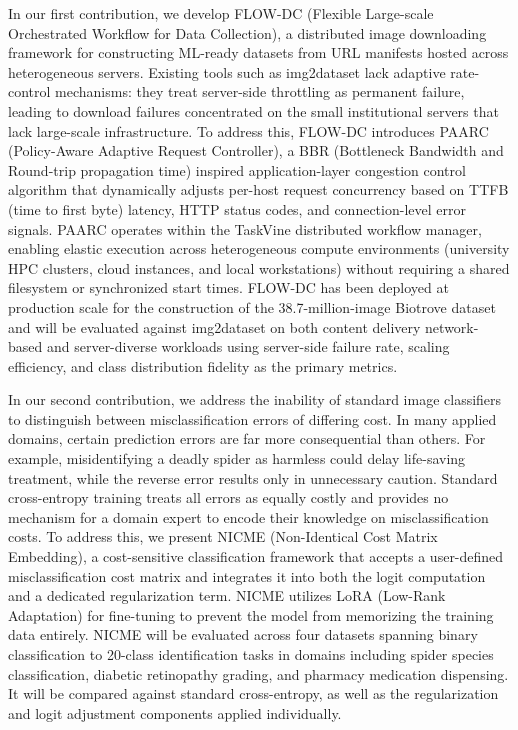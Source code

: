 \documentclass[11pt, letterpaper]{article}
\begin{document}
In our first contribution, we develop FLOW-DC (Flexible Large-scale
Orchestrated Workflow for Data Collection), a distributed image downloading
framework for constructing ML-ready datasets from URL manifests hosted across
heterogeneous servers. Existing tools such as img2dataset lack
adaptive rate-control mechanisms: they treat server-side throttling as
permanent failure, leading to download failures concentrated on the
small institutional servers that lack large-scale infrastructure. To address this, FLOW-DC introduces PAARC
(Policy-Aware Adaptive Request Controller), a BBR (Bottleneck Bandwidth and Round-trip propagation time) inspired application-layer
congestion control algorithm that dynamically adjusts per-host request
concurrency based on TTFB (time to first byte) latency, HTTP status codes, and connection-level
error signals. PAARC operates within the TaskVine distributed workflow
manager, enabling elastic execution across heterogeneous compute
environments (university HPC clusters, cloud instances, and local
workstations) without requiring a shared filesystem or synchronized start
times. FLOW-DC has been deployed at production scale for the construction of
the 38.7-million-image Biotrove dataset and will be evaluated against
img2dataset on both content delivery network-based and server-diverse workloads using
server-side failure rate, scaling efficiency, and class distribution fidelity
as the primary metrics.

In our second contribution, we address the inability of standard image classifiers to distinguish between misclassification errors of differing cost. In many applied domains, certain prediction errors are far more consequential than others. For example, misidentifying a deadly spider as harmless could delay life-saving treatment, while the reverse error results only in unnecessary caution. Standard cross-entropy training treats all errors as equally costly and provides no mechanism for a domain expert to encode their knowledge on misclassification costs. To address this, we present NICME (Non-Identical Cost Matrix Embedding), a cost-sensitive classification framework that accepts a user-defined misclassification cost matrix and integrates it into both the logit computation and a dedicated regularization term. NICME utilizes LoRA (Low-Rank Adaptation) for fine-tuning to prevent the model from memorizing the training data entirely. NICME will be evaluated across four datasets spanning binary classification to 20-class identification tasks in domains including spider species classification, diabetic retinopathy grading, and pharmacy medication dispensing. It will be compared against standard cross-entropy, as well as the regularization and logit adjustment components applied individually.
\end{document}
